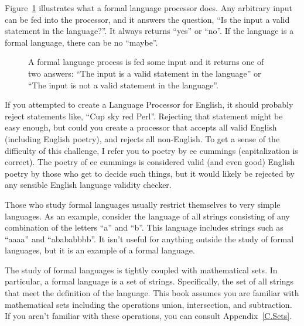 \documentclass[letterpaper,12pt,openany,reqno]{book}%
\newcommand{\code}[1] {\lstinline[breaklines=yes,breakatwhitespace=yes]{#1}}
\begin{document}
Figure~\ref{F.formal.language.processor} illustrates what a formal language processor does. Any arbitrary input can be fed into the processor, and it answers the question, ``Is the input a valid statement in the language?''. It always returns ``yes'' or ``no''. If the language is a formal language, there can be no ``maybe''.

\begin{figure}[hbt]
\centering
{}
 \caption[Formal language processor]{A formal language process is fed some input and it returns one of two answers: ``The input is a valid statement in the language'' or ``The input is not a valid statement in the language''.}
  \label{F.formal.language.processor}
\end{figure}

If you attempted to create a Language Processor for English, it should probably reject statements like, ``Cup sky red Perl''. Rejecting that statement might be easy enough, but could you create a processor that accepts all valid English (including English poetry), and rejects all non-English. To get a sense of the difficulty of this challenge, I refer you to poetry by ee cummings (capitalization is correct). The poetry of ee cummings is considered valid (and even good) English poetry by those who get to decide such things, but it would likely be rejected by any sensible English language validity checker.

Those who study formal languages usually restrict themselves to very simple languages. As an example, consider the language of all strings consisting of any combination of the letters ``a'' and ``b''. This language includes strings such as ``aaaa'' and ``abababbbb''. It isn't useful for anything outside the study of formal languages, but it is an example of a formal language.

The study of formal languages is tightly coupled with mathematical sets. In particular, a formal language is a set of strings. Specifically, the set of all strings that meet the definition of the language.  This book assumes you are familiar with mathematical sets including the operations union, intersection, and subtraction. If you aren't familiar with these operations, you can consult Appendix~\ref{C.Sets}.
\end{document}
